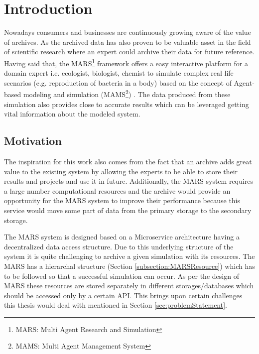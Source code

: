 \newpage
    \chapter{Introduction}
    Nowadays consumers and businesses are continuously growing aware of the value of archives. As the archived data has also proven
    to be valuable asset in the field of scientific research where an expert could archive their data for future reference. Having said that, the 
    MARS\footnote{MARS: Multi Agent Research and Simulation} framework offers a easy interactive platform for a domain expert i.e. ecologist, biologist, 
    chemist to simulate complex real life scenarios (e.g. reproduction of bacteria in a body) based on the concept of Agent-based modeling and simulation 
    (MAMS\footnote{MAMS: Multi Agent Management System}) \cite{agentModeling}. The data produced from these simulation also provides close to accurate 
    results which can be leveraged getting vital information about the modeled system.

        \section{Motivation}
        The inspiration for this work also comes from the fact that an archive adds great value to the existing system by allowing the experts to be
        able to store their results and projects and use it in future. Additionally, the MARS system requires a large number computational resources and
        the archive would provide an opportunity for the MARS system to improve their
        performance because this service would move some part of data from the primary storage to the secondary storage. 

        The MARS system is designed based on a Microservice architecture \cite{MicroserviceNewMan} having a decentralized data \cite{atomic} access structure. 
        Due to this underlying structure of the system it is quite challenging to archive a given simulation with its resources. The MARS has a hierarchal
        structure (Section \ref{subsection:MARSResource}) which has to be followed so that a successful simulation can occur. As per the design of MARS these resources
        are stored separately in different storages/databases which should be accessed only by a certain API. This brings upon certain challenges 
        this thesis would deal with mentioned in Section 
        \ref{sec:problemStatement}.  

